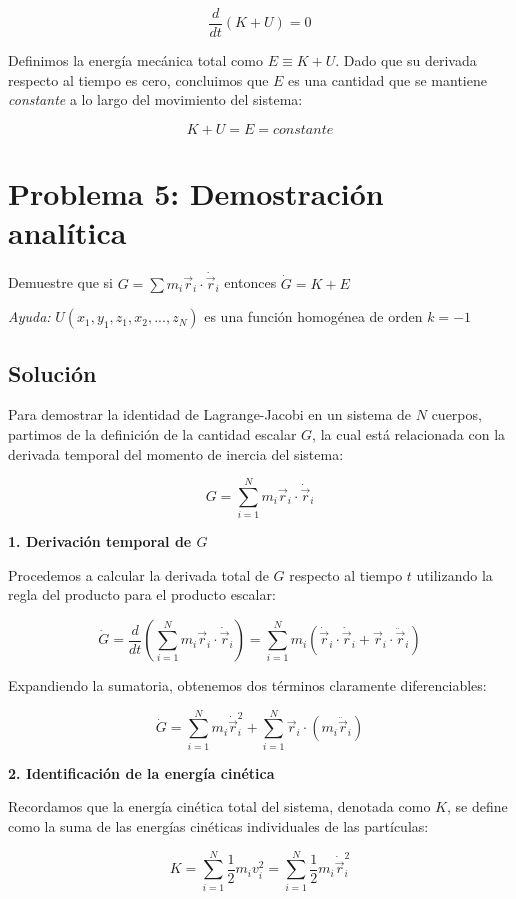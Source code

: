 \documentclass[a4paper]{article}
\begin{document}
$$ \frac{d}{dt} (K + U) = 0 $$

Definimos la energía mecánica total como $E \equiv K + U$. Dado que su derivada respecto al tiempo es cero, concluimos que $E$ es una cantidad que se mantiene \textit{constante} a lo largo del movimiento del sistema:

$$ K + U = E = \textit{constante} $$


\section{Problema 5: Demostración analítica}

Demuestre que si $G = \sum m_i \vec{r}_i\cdot \dot{\vec{r}}_i$ entonces $\dot{G} = K+E$ 

\textit{Ayuda:} $U(x_1,y_1,z_1,x_2,...,z_N)$ es una función homogénea de orden $k=-1$

	
\subsection{Solución}

Para demostrar la identidad de Lagrange-Jacobi en un sistema de $N$ cuerpos, partimos de la definición de la cantidad escalar $G$, la cual está relacionada con la derivada temporal del momento de inercia del sistema:

$$ G = \sum_{i=1}^N m_i \vec{r}_i \cdot \dot{\vec{r}}_i $$

\textbf{1. Derivación temporal de $G$}

Procedemos a calcular la derivada total de $G$ respecto al tiempo $t$ utilizando la regla del producto para el producto escalar:

$$ \dot{G} = \frac{d}{dt} \left( \sum_{i=1}^N m_i \vec{r}_i \cdot \dot{\vec{r}}_i \right) = \sum_{i=1}^N m_i \left( \dot{\vec{r}}_i \cdot \dot{\vec{r}}_i + \vec{r}_i \cdot \ddot{\vec{r}}_i \right) $$

Expandiendo la sumatoria, obtenemos dos términos claramente diferenciables:

$$ \dot{G} = \sum_{i=1}^N m_i \dot{\vec{r}}_i^2 + \sum_{i=1}^N \vec{r}_i \cdot (m_i \ddot{\vec{r}}_i) $$

\textbf{2. Identificación de la energía cinética}

Recordamos que la energía cinética total del sistema, denotada como $K$, se define como la suma de las energías cinéticas individuales de las partículas:

$$ K = \sum_{i=1}^N \frac{1}{2} m_i v_i^2 = \sum_{i=1}^N \frac{1}{2} m_i \dot{\vec{r}}_i^2 $$
\end{document}
